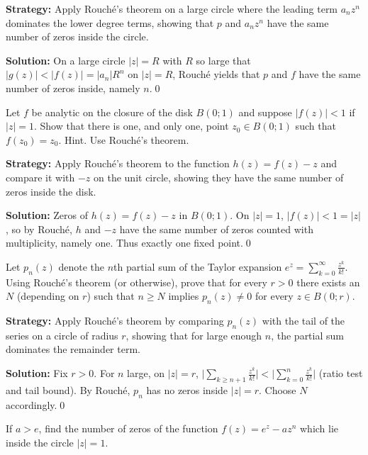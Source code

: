 \noindent\textbf{Strategy:} Apply Rouché's theorem on a large circle where the leading term \( a_n z^n \) dominates the lower degree terms, showing that \( p \) and \( a_n z^n \) have the same number of zeros inside the circle.

\bigskip\noindent\textbf{Solution:}
On a large circle $|z|=R$ with $R$ so large that $|g(z)|<|f(z)|=|a_n|R^n$ on $|z|=R$, Rouché yields that $p$ and $f$ have the same number of zeros inside, namely $n$.\qed


\begin{problembox}
Let \( f \) be analytic on the closure of the disk \( B(0; 1) \) and suppose \( |f(z)| < 1 \) if \( |z| = 1 \). Show that there is one, and only one, point \( z_0 \in B(0; 1) \) such that \( f(z_0) = z_0 \). Hint. Use Rouché's theorem.
\end{problembox}

\noindent\textbf{Strategy:} Apply Rouché's theorem to the function \( h(z) = f(z) - z \) and compare it with \( -z \) on the unit circle, showing they have the same number of zeros inside the disk.

\bigskip\noindent\textbf{Solution:}
Zeros of $h(z)=f(z)-z$ in $B(0;1)$. On $|z|=1$, $|f(z)|<1=|z|$, so by Rouché, $h$ and $-z$ have the same number of zeros counted with multiplicity, namely one. Thus exactly one fixed point.\qed


\begin{problembox}
Let \( p_n(z) \) denote the \( n \)th partial sum of the Taylor expansion \( e^z = \sum_{k=0}^{\infty} \frac{z^k}{k!} \). Using Rouché's theorem (or otherwise), prove that for every \( r > 0 \) there exists an \( N \) (depending on \( r \)) such that \( n \geq N \) implies \( p_n(z) \neq 0 \) for every \( z \in B(0; r) \).
\end{problembox}

\noindent\textbf{Strategy:} Apply Rouché's theorem by comparing \( p_n(z) \) with the tail of the series on a circle of radius \( r \), showing that for large enough \( n \), the partial sum dominates the remainder term.

\bigskip\noindent\textbf{Solution:}
Fix $r>0$. For $n$ large, on $|z|=r$, $\big|\sum_{k\ge n+1} \frac{z^k}{k!}\big|<\big|\sum_{k=0}^{n} \frac{z^k}{k!}\big|$ (ratio test and tail bound). By Rouché, $p_n$ has no zeros inside $|z|=r$. Choose $N$ accordingly.\qed


\begin{problembox}
If \( a > e \), find the number of zeros of the function \( f(z) = e^z - a z^n \) which lie inside the circle \( |z| = 1 \).
\end{problembox}

